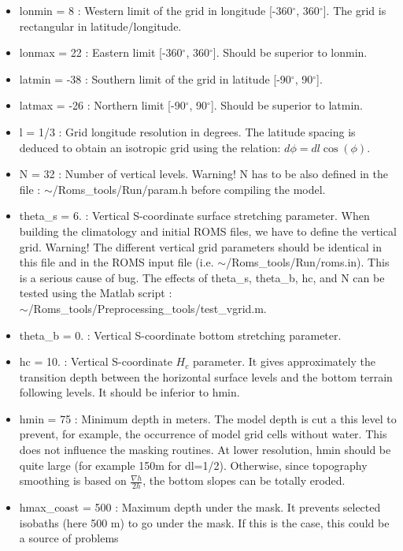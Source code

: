 \begin{itemize}
\item lonmin =  8 : Western limit of the grid in longitude [-360$^\circ$, 360$^\circ$]. 
The grid is rectangular in latitude/longitude.
\item lonmax = 22 : Eastern limit [-360$^\circ$, 360$^\circ$]. 
Should be superior to lonmin.
\item latmin = -38 : Southern limit of the grid in latitude [-90$^\circ$, 90$^\circ$].
\item latmax = -26 : Northern limit [-90$^\circ$, 90$^\circ$].
Should be superior to latmin.
\item l = 1/3 : Grid longitude resolution in degrees. The latitude spacing is deduced to
obtain an isotropic grid using the relation: $d\phi=dl\cos(\phi)$.
\item N = 32 : Number of vertical levels. Warning! N has to be also 
defined in the file : $\sim$/Roms\_tools/Run/param.h before compiling
the model.
\item theta\_s = 6. : Vertical S-coordinate surface stretching parameter. 
When building the climatology and initial ROMS files, we have to define
the vertical grid. Warning! The different vertical grid parameters should 
be identical in this file and in the ROMS input file (i.e. 
$\sim$/Roms\_tools/Run/roms.in).
This is a serious cause of bug.
The effects of theta\_s, theta\_b, hc, and N can be tested 
using the Matlab script : \\
$\sim$/Roms\_tools/Preprocessing\_tools/test\_vgrid.m.
\item theta\_b = 0. : Vertical S-coordinate bottom stretching parameter.
\item hc      = 10. : Vertical S-coordinate $H_c$ parameter. It gives approximately the
transition depth between the horizontal surface levels and the bottom terrain following
levels. It should be inferior to hmin.
\item hmin = 75 : Minimum depth in meters. The model depth is cut a this level 
to prevent, for example, the occurrence of model grid cells without water.
This does not influence the masking routines. At lower resolution, hmin should be 
quite large (for example 150m for dl=1/2). Otherwise, since topography smoothing 
is based on $\frac{\nabla h}{2h}$, the bottom slopes can be totally eroded.
\item hmax\_coast = 500 : Maximum depth under the mask. It prevents selected
isobaths (here 500 m) to go under the mask. If this is the case, 
this could be a source of problems

\end{itemize}
